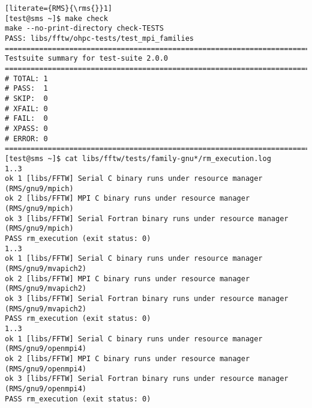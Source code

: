 \begin{lstlisting}[literate={RMS}{\rms{}}1]
[test@sms ~]$ make check
make --no-print-directory check-TESTS
PASS: libs/fftw/ohpc-tests/test_mpi_families
============================================================================
Testsuite summary for test-suite 2.0.0
============================================================================
# TOTAL: 1
# PASS:  1
# SKIP:  0
# XFAIL: 0
# FAIL:  0
# XPASS: 0
# ERROR: 0
============================================================================
[test@sms ~]$ cat libs/fftw/tests/family-gnu*/rm_execution.log
1..3
ok 1 [libs/FFTW] Serial C binary runs under resource manager (RMS/gnu9/mpich)
ok 2 [libs/FFTW] MPI C binary runs under resource manager (RMS/gnu9/mpich)
ok 3 [libs/FFTW] Serial Fortran binary runs under resource manager (RMS/gnu9/mpich)
PASS rm_execution (exit status: 0)
1..3
ok 1 [libs/FFTW] Serial C binary runs under resource manager (RMS/gnu9/mvapich2)
ok 2 [libs/FFTW] MPI C binary runs under resource manager (RMS/gnu9/mvapich2)
ok 3 [libs/FFTW] Serial Fortran binary runs under resource manager (RMS/gnu9/mvapich2)
PASS rm_execution (exit status: 0)
1..3
ok 1 [libs/FFTW] Serial C binary runs under resource manager (RMS/gnu9/openmpi4)
ok 2 [libs/FFTW] MPI C binary runs under resource manager (RMS/gnu9/openmpi4)
ok 3 [libs/FFTW] Serial Fortran binary runs under resource manager (RMS/gnu9/openmpi4)
PASS rm_execution (exit status: 0)
\end{lstlisting}
